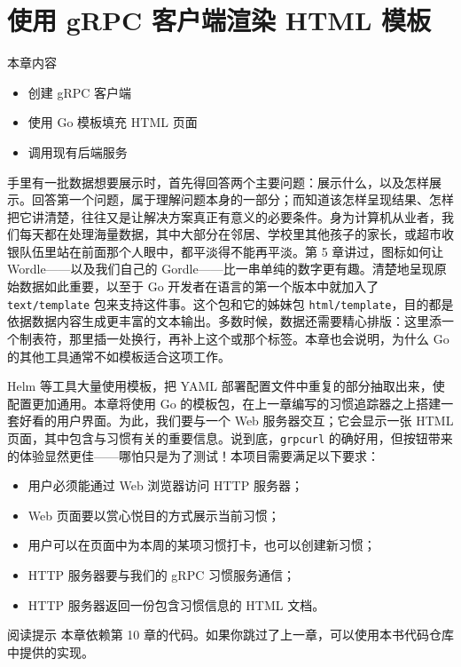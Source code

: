 \chapter{使用 gRPC 客户端渲染 HTML 模板}

\begin{infobox}{本章内容}
\begin{itemize}
  \item 创建 gRPC 客户端
  \item 使用 Go 模板填充 HTML 页面
  \item 调用现有后端服务
\end{itemize}
\end{infobox}

手里有一批数据想要展示时，首先得回答两个主要问题：展示什么，以及怎样展示。回答第一个问题，属于理解问题本身的一部分；而知道该怎样呈现结果、怎样把它讲清楚，往往又是让解决方案真正有意义的必要条件。身为计算机从业者，我们每天都在处理海量数据，其中大部分在邻居、学校里其他孩子的家长，或超市收银队伍里站在前面那个人眼中，都平淡得不能再平淡。第 5 章讲过，图标如何让 Wordle——以及我们自己的 Gordle——比一串单纯的数字更有趣。清楚地呈现原始数据如此重要，以至于 Go 开发者在语言的第一个版本中就加入了 \texttt{text/template} 包来支持这件事。这个包和它的姊妹包 \texttt{html/template}，目的都是依据数据内容生成更丰富的文本输出。多数时候，数据还需要精心排版：这里添一个制表符，那里插一处换行，再补上这个或那个标签。本章也会说明，为什么 Go 的其他工具通常不如模板适合这项工作。

Helm 等工具大量使用模板，把 YAML 部署配置文件中重复的部分抽取出来，使配置更加通用。本章将使用 Go 的模板包，在上一章编写的习惯追踪器之上搭建一套好看的用户界面。为此，我们要与一个 Web 服务器交互；它会显示一张 HTML 页面，其中包含与习惯有关的重要信息。说到底，\texttt{grpcurl} 的确好用，但按钮带来的体验显然更佳——哪怕只是为了测试！本项目需要满足以下要求：

\begin{itemize}
  \item 用户必须能通过 Web 浏览器访问 HTTP 服务器；
  \item Web 页面要以赏心悦目的方式展示当前习惯；
  \item 用户可以在页面中为本周的某项习惯打卡，也可以创建新习惯；
  \item HTTP 服务器要与我们的 gRPC 习惯服务通信；
  \item HTTP 服务器返回一份包含习惯信息的 HTML 文档。
\end{itemize}

\begin{infobox}{阅读提示}
本章依赖第 10 章的代码。如果你跳过了上一章，可以使用本书代码仓库中提供的实现。
\end{infobox}

